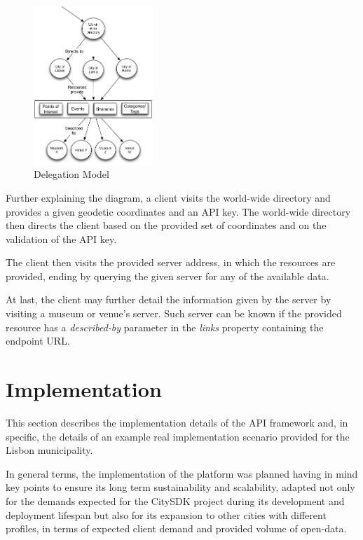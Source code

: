 \documentclass[times]{ettauth}
\begin{document}
\begin{figure}
\centering
\includegraphics[width=0.4\textwidth]{images/delegation}
\caption{Delegation Model}
\label{fig:delegation}
\end{figure}

Further explaining the diagram, a client visits the world-wide directory and provides a given geodetic coordinates and an API key. The world-wide directory then directs the client based on the provided set of  coordinates and on the validation of the API key.

The client then visits the provided server address, in which the resources are provided, ending by querying the given server for any of the available data. 

At last, the client may further detail the information given by the server by visiting a museum or venue's server. Such server can be known if the provided resource has a \textit{described-by} parameter in the \textit{links} property containing the endpoint URL.

\section{Implementation}
\label{s:implementation}
This section describes the implementation details of the API framework and, in specific, the details of an example real implementation scenario provided for the Lisbon municipality. 

In general terms, the implementation of the platform was planned having in mind key points to ensure its long term sustainability and scalability, adapted not only for the demands expected for the CitySDK project during its development and deployment lifespan but also for its expansion to other cities with different profiles, in terms of expected client demand and provided volume of open-data.
\end{document}
